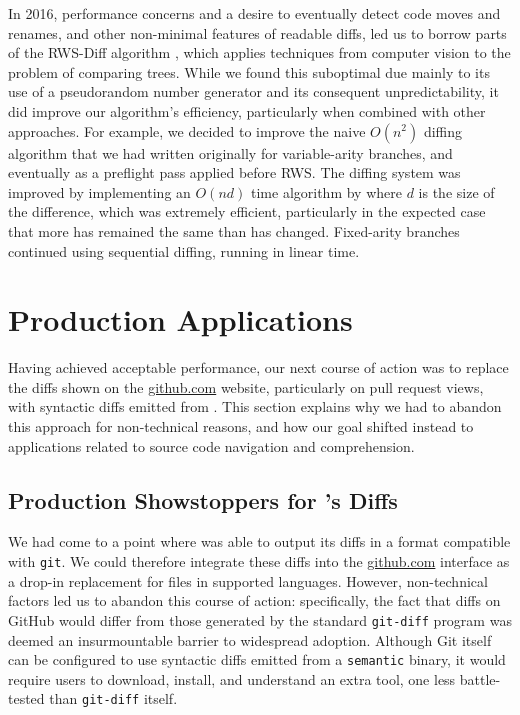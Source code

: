 \documentclass[acmsmall,fleqn]{acmart}
\begin{document}
In 2016, performance concerns and a desire to eventually detect code moves and
renames, and other non-minimal features of readable diffs, led us to borrow
parts of the RWS-Diff algorithm \cite{finis13rwsdiff}, which applies techniques
from computer vision to the problem of comparing trees. While we found this
suboptimal due mainly to its use of a pseudorandom number generator and its
consequent unpredictability, it did improve our algorithm's efficiency,
particularly when combined with other approaches. For example, we decided to
improve the naive $O(n^2)$ diffing algorithm that we had written originally for
variable-arity branches, and eventually as a preflight pass applied before RWS.
The diffing system was improved by implementing an $O(nd)$ time algorithm by
\citet{Myers86Diff} where $d$ is the size of the difference, which was
extremely efficient, particularly in the expected case that more has remained
the same than has changed. Fixed-arity branches continued using sequential
diffing, running in linear time.

\section{Production Applications} \label{sec:prodapps}

Having achieved acceptable performance, our next course of action was to
replace the diffs shown on the \href{https://github.com}{github.com} website,
particularly on pull request views, with syntactic diffs emitted from
\semantic{}. This section explains why we had to abandon this approach for
non-technical reasons, and how our goal shifted instead to applications
related to source code navigation and comprehension.

\subsection{Production Showstoppers for \semantic's Diffs}
We had come to a point where \semantic{} was able to output its diffs in a format
compatible with \texttt{git}. We could therefore integrate these diffs into the
\href{https://github.com}{github.com} interface as a drop-in replacement for
files in supported languages. However, non-technical factors led us to abandon
this course of action: specifically, the fact that diffs on GitHub would differ
from those generated by the standard \texttt{git-diff} program was deemed an
insurmountable barrier to widespread adoption. Although Git itself can be
configured to use syntactic diffs emitted from a \texttt{semantic} binary, it
would require users to download, install, and understand an extra tool, one
less battle-tested than \texttt{git-diff} itself.
\end{document}
